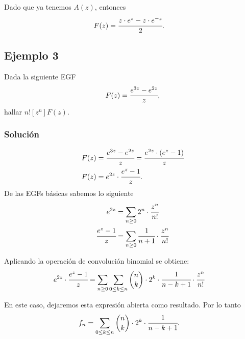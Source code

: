 Dado que ya tenemos $A(z)$, entonces
\begin{align*}
F(z)&=\cfrac{z\cdot e^z-z\cdot  e^{-z}}{2}.
\end{align*}

\subsection{Ejemplo 3}

Dada la siguiente EGF
$$F(z)=\cfrac{e^{3z}-e^{2z}}{z},$$ hallar $n![z^n]F(z)$.

\subsubsection*{Solución}
\begin{align*}
F(z)&=\cfrac{e^{3z}-e^{2z}}{z}=\cfrac{e^{2z}\cdot(e^z-1)}{z}\\
F(z)&=e^{2z}\cdot \cfrac{e^z-1}{z}.
\end{align*}
De las EGFs básicas sabemos lo siguiente
\begin{align*}
e^{2z}&=\sum_{n\geq0}{2^n\cdot\cfrac{z^{n}}{n!}}\\
\cfrac{e^z-1}{z}&=\sum_{n\geq0}{\cfrac{1}{n+1}\cdot\cfrac{z^{n}}{n!}}
\end{align*}

Aplicando la operación de convolución binomial se obtiene:
\begin{align*}
e^{2z}\cdot \cfrac{e^z-1}{z}&=\sum_{n\geq0}{\sum_{0\leq k\leq n}{\binom{n}{k}\cdot 2^k\cdot \cfrac{1}{n-k+1}\cdot\cfrac{z^{n}}{n!}}}
\end{align*}

En este caso, dejaremos esta expresión abierta como resultado. Por lo tanto
\begin{align*}
f_n&=\sum_{0\leq k\leq n}{\binom{n}{k}\cdot 2^k\cdot \cfrac{1}{n-k+1}}.
\end{align*}
